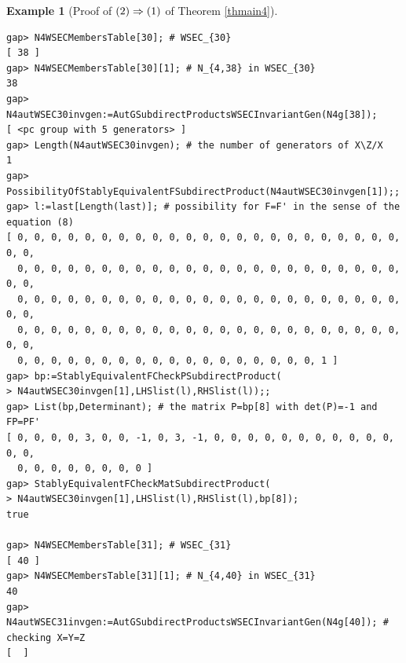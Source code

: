 \documentclass{amsart}
\theoremstyle{plain}
\theoremstyle{definition}
\newtheorem{example}[theorem]{Example}
\theoremstyle{remark}
\begin{document}
\begin{example}[Proof of ${\rm (2)}\Rightarrow {\rm (1)}$ of {Theorem \ref{thmain4}}]
\begin{verbatim}
gap> N4WSECMembersTable[30]; # WSEC_{30}
[ 38 ]
gap> N4WSECMembersTable[30][1]; # N_{4,38} in WSEC_{30}
38
gap> N4autWSEC30invgen:=AutGSubdirectProductsWSECInvariantGen(N4g[38]);
[ <pc group with 5 generators> ]
gap> Length(N4autWSEC30invgen); # the number of generators of X\Z/X
1
gap> PossibilityOfStablyEquivalentFSubdirectProduct(N4autWSEC30invgen[1]);;
gap> l:=last[Length(last)]; # possibility for F=F' in the sense of the equation (8)
[ 0, 0, 0, 0, 0, 0, 0, 0, 0, 0, 0, 0, 0, 0, 0, 0, 0, 0, 0, 0, 0, 0, 0, 0, 0, 
  0, 0, 0, 0, 0, 0, 0, 0, 0, 0, 0, 0, 0, 0, 0, 0, 0, 0, 0, 0, 0, 0, 0, 0, 0, 
  0, 0, 0, 0, 0, 0, 0, 0, 0, 0, 0, 0, 0, 0, 0, 0, 0, 0, 0, 0, 0, 0, 0, 0, 0, 
  0, 0, 0, 0, 0, 0, 0, 0, 0, 0, 0, 0, 0, 0, 0, 0, 0, 0, 0, 0, 0, 0, 0, 0, 0, 
  0, 0, 0, 0, 0, 0, 0, 0, 0, 0, 0, 0, 0, 0, 0, 0, 0, 0, 1 ]
gap> bp:=StablyEquivalentFCheckPSubdirectProduct(
> N4autWSEC30invgen[1],LHSlist(l),RHSlist(l));;
gap> List(bp,Determinant); # the matrix P=bp[8] with det(P)=-1 and FP=PF'
[ 0, 0, 0, 0, 3, 0, 0, -1, 0, 3, -1, 0, 0, 0, 0, 0, 0, 0, 0, 0, 0, 0, 0, 0, 
  0, 0, 0, 0, 0, 0, 0, 0 ]
gap> StablyEquivalentFCheckMatSubdirectProduct(
> N4autWSEC30invgen[1],LHSlist(l),RHSlist(l),bp[8]);
true

gap> N4WSECMembersTable[31]; # WSEC_{31}
[ 40 ]
gap> N4WSECMembersTable[31][1]; # N_{4,40} in WSEC_{31}
40
gap> N4autWSEC31invgen:=AutGSubdirectProductsWSECInvariantGen(N4g[40]); # checking X=Y=Z
[  ]


\end{verbatim}
\end{example}
\end{document}
